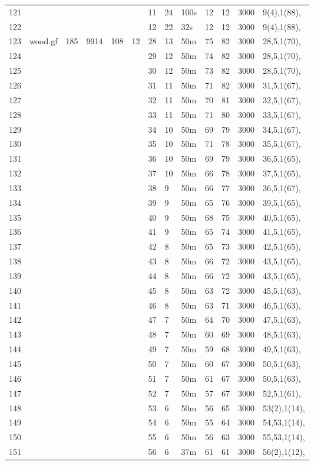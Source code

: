 \documentclass{article}
\begin{document}
\begin{longtable}{|l |l |l |l |l |l |l |l |l |l |l |l |l |}
121&&&&&&11&24&100s&12&12&3000&9(4),1(88),\\
122&&&&&&12&22&32s&12&12&3000&9(4),1(88),\\
123&wood.gf&185&9914&108&12&28&13&50m&75&82&3000&28,5,1(70),\\
124&&&&&&29&12&50m&74&82&3000&28,5,1(70),\\
125&&&&&&30&12&50m&73&82&3000&28,5,1(70),\\
126&&&&&&31&11&50m&71&82&3000&31,5,1(67),\\
127&&&&&&32&11&50m&70&81&3000&32,5,1(67),\\
128&&&&&&33&11&50m&71&80&3000&33,5,1(67),\\
129&&&&&&34&10&50m&69&79&3000&34,5,1(67),\\
130&&&&&&35&10&50m&71&78&3000&35,5,1(67),\\
131&&&&&&36&10&50m&69&79&3000&36,5,1(65),\\
132&&&&&&37&10&50m&66&78&3000&37,5,1(65),\\
133&&&&&&38&9&50m&66&77&3000&36,5,1(67),\\
134&&&&&&39&9&50m&65&76&3000&39,5,1(65),\\
135&&&&&&40&9&50m&68&75&3000&40,5,1(65),\\
136&&&&&&41&9&50m&65&74&3000&41,5,1(65),\\
137&&&&&&42&8&50m&65&73&3000&42,5,1(65),\\
138&&&&&&43&8&50m&66&72&3000&43,5,1(65),\\
139&&&&&&44&8&50m&66&72&3000&43,5,1(65),\\
140&&&&&&45&8&50m&63&72&3000&45,5,1(63),\\
141&&&&&&46&8&50m&63&71&3000&46,5,1(63),\\
142&&&&&&47&7&50m&64&70&3000&47,5,1(63),\\
143&&&&&&48&7&50m&60&69&3000&48,5,1(63),\\
144&&&&&&49&7&50m&59&68&3000&49,5,1(63),\\
145&&&&&&50&7&50m&60&67&3000&50,5,1(63),\\
146&&&&&&51&7&50m&61&67&3000&50,5,1(63),\\
147&&&&&&52&7&50m&57&67&3000&52,5,1(61),\\
148&&&&&&53&6&50m&56&65&3000&53(2),1(14),\\
149&&&&&&54&6&50m&55&64&3000&54,53,1(14),\\
150&&&&&&55&6&50m&56&63&3000&55,53,1(14),\\
151&&&&&&56&6&37m&61&61&3000&56(2),1(12),\\

\end{longtable}
\end{document}
